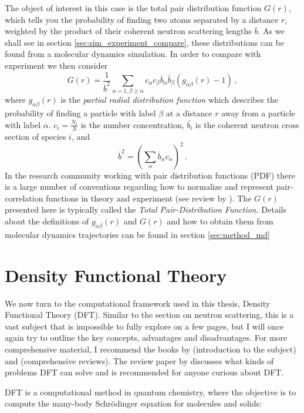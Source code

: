 The object of interest in this case is the total pair distribution function $G(r)$, which tells you the probability of finding two atoms separated by a distance $r$, weighted by the product of their coherent neutron scattering lengths $\overline{b}$. As we shall see in section \ref{sec:sim_experiment_compare}, these distributions can be found from a molecular dynamics simulation. In order to compare with experiment  we then consider
%
\[ G(r) = \frac{1}{\overline{b}^2} \sum_{\alpha=1,\beta\geq\alpha} c_\alpha c_\beta \overline{b}_\alpha \overline{b}_\beta (g_{\alpha\beta}(r) - 1) \, , \]
%
where $g_{\alpha\beta}(r)$ is the \emph{partial radial distribution function} which describes the probability of finding a particle with label $\beta$ at a distance $r$ away from a particle with label $\alpha$. $c_i = \frac{N_i}{N}$ is the number concentration, $\bar{b_i}$ is the coherent neutron cross section of species $i$,  and 
%
\[ \overline{b}^2 = \left(\sum_\alpha \overline{b}_\alpha c_\alpha \right)^2 \, . \]
In the research community working with pair distribution functions (PDF) there is a large number of conventions regarding how to normalize and represent pair-correlation functions in theory and experiment (see review by \citeauthor{Keen2001} \cite{Keen2001}). The $G(r)$ presented here is typically called the \emph{Total Pair-Distribution Function}. Details about the definitions of $g_{\alpha\beta}(r)$ and $G(r)$ and how to obtain them from molecular dynamics trajectories can be found in section \ref{sec:method_md}

\section{Density Functional Theory}\label{sec:dft}
We now turn to the computational framework used in this thesis, Density Functional Theory (DFT). Similar to the section on neutron scattering, this is a vast subject that is impossible to fully explore on a few pages, but I will once again try to outline the key concepts, advantages and disadvantages. For more comprehensive material, I recommend the books by \citeauthor{Giustino2014} \cite{Giustino2014} (introduction to the subject) and \citeauthor{Martin2004} \cite{Martin2004,Martin2016} (comprehensive reviews). The review paper by \citeauthor{Hoffmann1987} \cite{Hoffmann1987} discusses what kinds of problems DFT can solve and is recommended for anyone curious about DFT.

DFT is a computational method in quantum chemistry, where the objective is to compute the many-body Schr\"odinger equation for molecules and solids:

